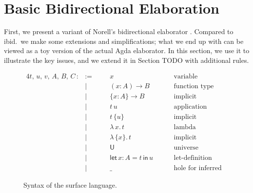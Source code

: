 \documentclass[acmsmall,review,anonymous,prologue,dvipsnames]{acmart}\settopmatter{printfolios=true,printccs=false,printacmref=false}
\newcommand{\slet}{\mathsf{let}}
\renewcommand{\sin}{\mathsf{in}}
\renewcommand{\U}{\mathsf{U}}
\begin{document}
\section{Basic Bidirectional Elaboration}
\label{sec:basic_bidirectional_elaboration}

First, we present a variant of Norell's bidirectional elaborator
\cite[Chapter~3]{norell07thesis}. Compared to ibid.\ we make some extensions and
simplifications; what we end up with can be viewed as a toy version of the
actual Agda elaborator. In this section, we use it to illustrate the key issues,
and we extend it in Section TODO with additional rules.
\begin{figure}[h]
\begin{alignat*}{4}
  t,\,u,\,v,\,A,\,B,\,C\, :&:=\quad  && x\hspace{8em}              & \text{variable}                 &  \\
                           & |       && (x : A)\to B               & \text{function type}            &  \\
                           & |       && \{x : A\}\to B             & \text{implicit function type}   &  \\
                           & |       && t\,u                       & \text{application}              &  \\
                           & |       && t\,\{u\}                   & \text{implicit application}     &  \\
                           & |       && \lambda\,x.\, t            & \text{lambda abstraction}       &  \\
                           & |       && \lambda\,\{x\}.\,t         & \text{implicit abstraction}     &  \\
                           & |       && \U                         & \text{universe}                 &  \\
                           & |       && \slet\,x : A = t\,\sin\, u & \text{let-definition}           &  \\
                           & |       && \_                         & \text{hole for inferred term}   &
\end{alignat*}
\caption{Syntax of the surface language.}
\label{fig:surface}
\end{figure}
\end{document}
